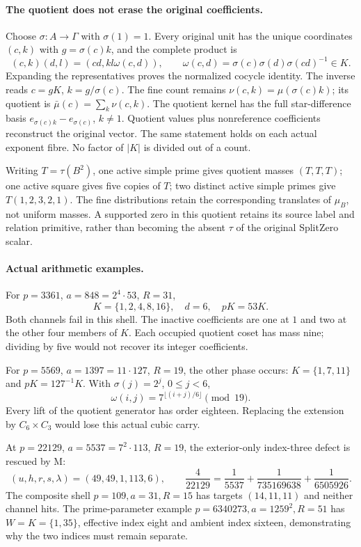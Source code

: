 \documentclass[10pt,a4paper]{article}
\begin{document}
\newpage
\paragraph{The quotient does not erase the original coefficients.}
Choose $\sigma:A\to\Gamma$ with $\sigma(1)=1$. Every original unit has the
unique coordinates $(c,k)$ with $g=\sigma(c)k$, and the complete product is
\[
 (c,k)(d,l)=(cd,kl\omega(c,d)),\qquad
 \omega(c,d)=\sigma(c)\sigma(d)\sigma(cd)^{-1}\in K.       \tag{6}
\]
Expanding the representatives proves the normalized cocycle identity.
The inverse reads $c=gK$, $k=g/\sigma(c)$. The fine count remains
$\nu(c,k)=\mu(\sigma(c)k)$; its quotient is $\bar\mu(c)=\sum_k\nu(c,k)$.
The quotient kernel has the full star-difference basis
$e_{\sigma(c)k}-e_{\sigma(c)}$, $k\ne1$. Quotient values plus nonreference
coefficients reconstruct the original vector. The same statement holds on
each actual exponent fibre. No factor of $|K|$ is divided out of a count.

Writing $T=\tau(B^2)$, one active simple prime gives quotient masses $(T,T,T)$;
one active square gives five copies of $T$; two distinct active simple primes
give $T(1,2,3,2,1)$. The fine distributions retain the corresponding translates
of $\mu_B$, not uniform masses. A supported zero in this quotient retains its
source label and relation primitive, rather than becoming the absent $\tau$
of the original SplitZero scalar.

\paragraph{Actual arithmetic examples.}
For $p=3361$, $a=848=2^4\cdot53$, $R=31$,
\[
 K=\{1,2,4,8,16\},\quad d=6,\quad pK=53K.
\]
Both channels fail in this shell. The inactive coefficients are one at $1$
and two at the other four members of $K$. Each occupied quotient coset has
mass nine; dividing by five would not recover its integer coefficients.

For $p=5569$, $a=1397=11\cdot127$, $R=19$, the other phase occurs:
$K=\{1,7,11\}$ and $pK=127^{-1}K$. With $\sigma(j)=2^j$, $0\le j<6$,
\[
 \boxed{\omega(i,j)=7^{\lfloor(i+j)/6\rfloor}\pmod{19}.} \tag{7}
\]
Every lift of the quotient generator has order eighteen. Replacing the
extension by $C_6\times C_3$ would lose this actual cubic carry.

At $p=22129$, $a=5537=7^2\cdot113$, $R=19$, the exterior-only index-three
defect is rescued by M:
\[
 (u,h,r,s,\lambda)=(49,49,1,113,6),\qquad
 \frac4{22129}=\frac1{5537}+\frac1{735169638}+\frac1{6505926}.
\]
The composite shell $p=109,a=31,R=15$ has targets $(14,11,11)$ and neither
channel hits. The prime-parameter example $p=6340273,a=1259^2,R=51$ has
$W=K=\{1,35\}$, effective index eight and ambient index sixteen, demonstrating
why the two indices must remain separate.
\end{document}
